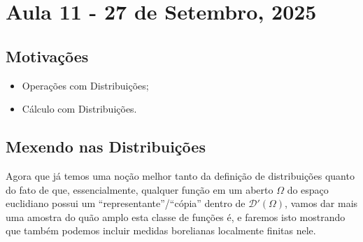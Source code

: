 \documentclass[../distribution_theory_notes.tex]{subfiles}
\begin{document}
\section{Aula 11 - 27 de Setembro, 2025}
\subsection{Motivações}
\begin{itemize}
 \item Operações com Distribuições;
 \item Cálculo com Distribuições.
\end{itemize}
\subsection{Mexendo nas Distribuições}

Agora que já temos uma noção melhor tanto da definição de distribuições quanto do fato de que, essencialmente, qualquer função em um aberto \(\Omega \) do espaço euclidiano possui um ``representante''/``cópia'' dentro de \(\mathcal{D}'(\Omega )\), vamos dar mais uma amostra do quão amplo esta classe de funções é, e faremos isto mostrando que também podemos incluir medidas borelianas localmente finitas nele.
\end{document}
